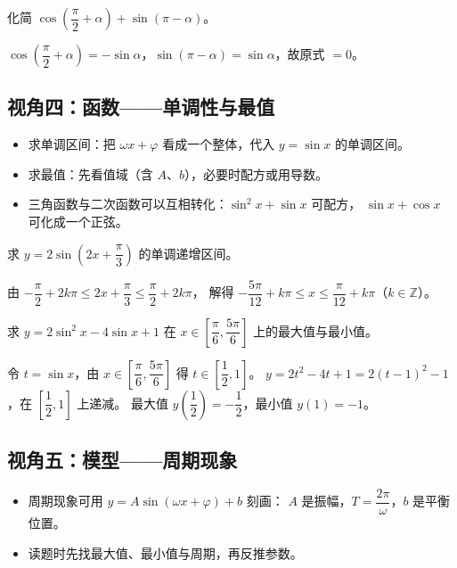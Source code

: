 \begin{explore}
\begin{problem}
化简 $\cos\left(\dfrac{\pi}{2}+\alpha\right)+\sin(\pi-\alpha)$。
\end{problem}
\begin{solution}
$\cos\left(\dfrac{\pi}{2}+\alpha\right)=-\sin\alpha$，$\sin(\pi-\alpha)=\sin\alpha$，故原式 $=0$。
\end{solution}

\subsection{视角四：函数——单调性与最值}

\begin{itemize}
  \item 求单调区间：把 $\omega x+\varphi$ 看成一个整体，代入 $y=\sin x$ 的单调区间。
  \item 求最值：先看值域（含 $A$、$b$），必要时配方或用导数。
  \item 三角函数与二次函数可以互相转化：$\sin^2 x+\sin x$ 可配方，
        $\sin x+\cos x$ 可化成一个正弦。
\end{itemize}

\begin{example}
求 $y=2\sin\left(2x+\dfrac{\pi}{3}\right)$ 的单调递增区间。
\end{example}
\begin{solution}
由 $-\dfrac{\pi}{2}+2k\pi\leq2x+\dfrac{\pi}{3}\leq\dfrac{\pi}{2}+2k\pi$，
解得 $-\dfrac{5\pi}{12}+k\pi\leq x\leq\dfrac{\pi}{12}+k\pi$（$k\in\mathbb{Z}$）。
\end{solution}

\begin{problem}
求 $y=2\sin^2 x-4\sin x+1$ 在 $x\in\left[\dfrac{\pi}{6},\dfrac{5\pi}{6}\right]$ 上的最大值与最小值。
\end{problem}
\begin{solution}
令 $t=\sin x$，由 $x\in\left[\dfrac{\pi}{6},\dfrac{5\pi}{6}\right]$ 得 $t\in\left[\dfrac12,1\right]$。
$y=2t^2-4t+1=2(t-1)^2-1$，在 $\left[\dfrac12,1\right]$ 上递减。
最大值 $y\left(\dfrac12\right)=-\dfrac12$，最小值 $y(1)=-1$。
\end{solution}

\subsection{视角五：模型——周期现象}

\begin{itemize}
  \item 周期现象可用 $y=A\sin(\omega x+\varphi)+b$ 刻画：
        $A$ 是振幅，$T=\dfrac{2\pi}{\omega}$，$b$ 是平衡位置。
  \item 读题时先找最大值、最小值与周期，再反推参数。
\end{itemize}


\end{explore}
